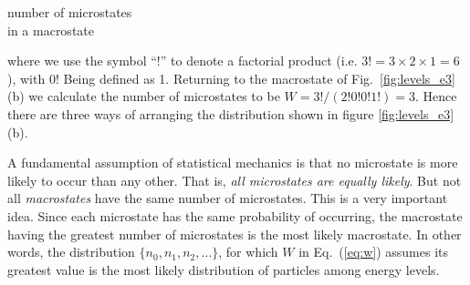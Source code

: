 \begin{large}
\begin{center}
number of microstates\\
in a macrostate
\end{center}
\end{large}

\noindent where we use the symbol ``!'' to denote a factorial product
(i.e.  $3! = 3\times2\times 1 = 6$), with $0!$ Being defined as 1.
Returning to the macrostate of Fig.~\ref{fig:levels_e3}(b) we
calculate the number of microstates to be $W = 3!/(2!0!0!1!) = 3$.
Hence there are three ways of arranging the distribution shown in
figure \ref{fig:levels_e3}(b).

A fundamental assumption of statistical mechanics is that no
microstate is more likely to occur than any other.  That is, {\em all
microstates are equally likely}.  But not all {\em macrostates} have
the same number of microstates.  This is a very important idea.  Since
each microstate has the same probability of occurring, the macrostate
having the greatest number of microstates is the most likely
macrostate.  In other words, the distribution $\{n_0, n_1,
n_2,\dots\}$, for which $W$ in Eq.~(\ref{eq:w}) assumes its greatest
value is the most likely distribution of particles among energy
levels.  

  

